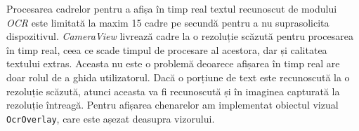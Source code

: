 Procesarea cadrelor pentru a afișa în timp real textul recunoscut de modului \emph{OCR} este limitată la maxim 15 cadre pe secundă pentru a nu suprasolicita dispozitivul. \emph{CameraView} livrează cadre la o rezoluție scăzută pentru procesarea în timp real, ceea ce scade timpul de procesare al acestora, dar și calitatea textului extras. Aceasta nu este o problemă deoarece afișarea în timp real are doar rolul de a ghida utilizatorul. Dacă o porțiune de text este recunoscută la o rezoluție scăzută, atunci aceasta va fi recunoscută și în imaginea capturată la rezoluție întreagă. Pentru afișarea chenarelor am implementat obiectul vizual \texttt{OcrOverlay}, care este așezat deasupra vizorului.



